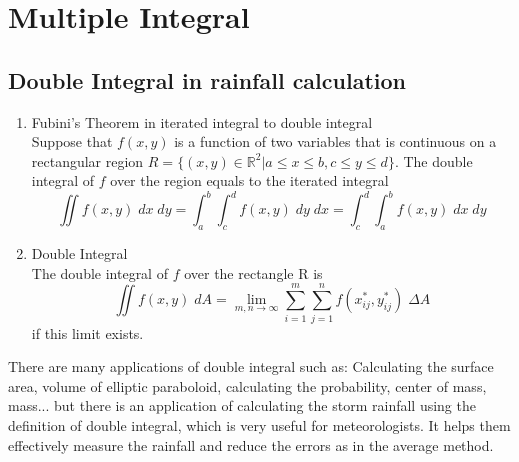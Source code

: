 \documentclass[a4paper]{article}
\begin{document}
\section{Multiple Integral}
\subsection{Double Integral in rainfall calculation}
\begin{enumerate}[label=\textbf{$\alph*.$}]
	\item Fubini's Theorem\cite{anton2010calculus} in iterated integral to double integral \\
	      Suppose that $f(x,y)$ is a function of two variables that is continuous on a rectangular region $R=\{(x,y)\in \mathbb{R}^2|a\leq x\leq b, c\leq y\leq d\}$. The double integral of $f$ over the region equals to the iterated integral
	      \begin{equation*}
		      \iint f(x,y)\;dx\;dy = \int_a^b \int_c^d f(x,y)\;dy\;dx = \int_c^d \int_a^b f(x,y)\;dx\;dy
	      \end{equation*}
	      
	\item Double Integral \\
	      The double integral of $f$ over the rectangle R is
	      \begin{equation*}
		      \iint f(x,y)\;dA = \lim_{m,n \rightarrow \infty} \sum_{i=1}^{m} \sum_{j=1}^{n} f(x_{ij}^{*}, y_{ij}^{*})\; \Delta A
	      \end{equation*}
	      if this limit exists.
\end{enumerate}
There are many applications of double integral such as: Calculating the surface area, volume of elliptic paraboloid, calculating the probability, center of mass, mass... but there is an application of calculating the storm rainfall using the definition of double integral, which is very useful for meteorologists. It helps them effectively measure the rainfall and reduce the errors as in the average method.
\end{document}
